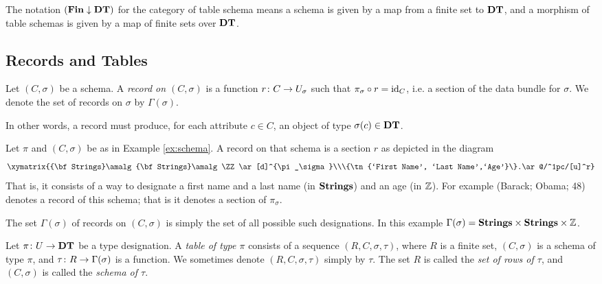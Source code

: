 \documentclass{amsart}
\def\DT{{\bf DT}}
\def\Strings{{\bf Strings}}
\def\Fin{{\bf Fin}}
\begin{document}
\begin{remark}

The notation $(\Fin\down\DT)$ for the category of table schema means a schema is given by a map from a finite set to $\DT$, and a morphism of table schemas is given by a map of finite sets over $\DT$.

\end{remark}

\subsection{Records and Tables}

\begin{definition}

Let $(C,\sigma)$ be a schema.  A {\em record on $(C,\sigma)$} is a function $r\colon C\rightarrow U_\sigma$ such that $\pi_\sigma\circ r=\textnormal{id}_C$, i.e. a section of the data bundle for $\sigma$.  We denote the set of records on $\sigma$ by $\Gamma(\sigma)$.

\end{definition}

In other words, a record must produce, for each attribute $c\in C$, an object of type $\sigma(c)\in\DT$.  

\begin{example}\label{ex:record}

Let $\pi$ and $(C,\sigma)$ be as in Example \ref{ex:schema}.  A record on that schema is a section $r$ as depicted in the diagram $$\xymatrix{\Strings\amalg\Strings\amalg\ZZ\ar[d]^{\pi_\sigma}\\\{\tn{`First Name', `Last Name',`Age'}\}.\ar@/^1pc/[u]^r}$$  That is, it consists of a way to designate a first name and a last name (in $\Strings$) and an age (in ${\mathbb Z}$).  For example (Barack; Obama; 48) denotes a record of this schema; that is it denotes a section of $\pi_\sigma$.

The set $\Gamma(\sigma)$ of records on $(C,\sigma)$ is simply the set of all possible such designations.  In this example $\Gamma(\sigma)=\Strings\cross\Strings\cross\ZZ$.

\end{example}

\begin{definition}

Let $\pi\taking U\to\DT$ be a type designation.  A {\em table of type $\pi$} consists of a sequence $(R,C,\sigma,\tau)$, where $R$ is a finite set, $(C,\sigma)$ is a schema of type $\pi$,  and $\tau\colon R\rightarrow\Gamma(\sigma)$ is a function.  We sometimes denote $(R,C,\sigma,\tau)$ simply by $\tau$.  The set $R$ is called the {\em set of rows of $\tau$}, and $(C,\sigma)$ is called the {\em schema of $\tau$}.

\end{definition}
\end{document}
